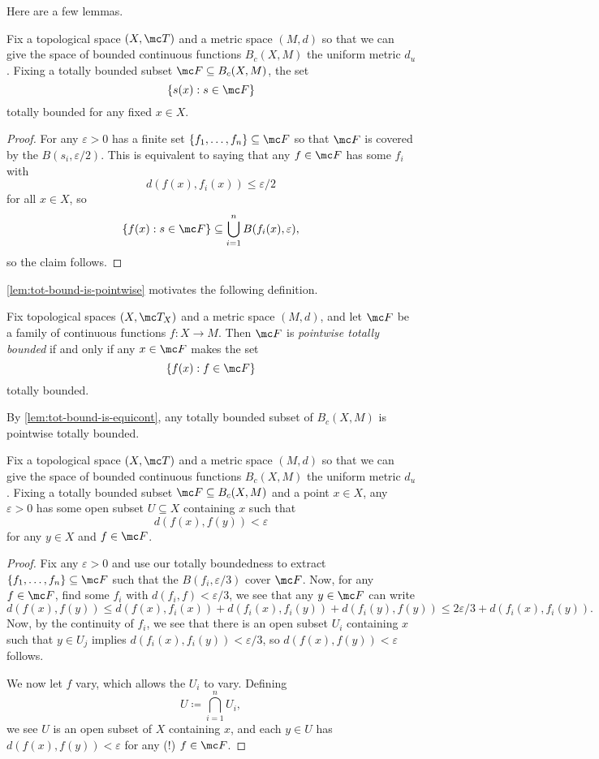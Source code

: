 \documentclass[../notes.tex]{subfiles}
\begin{document}
Here are a few lemmas.
\begin{lemma} \label{lem:tot-bound-is-pointwise}
	Fix a topological space $(X,\mc T)$ and a metric space $(M,d)$ so that we can give the space of bounded continuous functions $B_c(X,M)$ the uniform metric $d_u$. Fixing a totally bounded subset $\mc F\subseteq B_c(X,M)$, the set
	\[\{s(x):s\in \mc F\}\]
	totally bounded for any fixed $x\in X$.
\end{lemma}
\begin{proof}
	For any $\varepsilon>0$ has a finite set $\{f_1,\ldots,f_n\}\subseteq \mc F$ so that $\mc F$ is covered by the $B(s_i,\varepsilon/2)$. This is equivalent to saying that any $f\in \mc F$ has some $f_i$ with
	\[d(f(x),f_i(x))\le\varepsilon/2\]
	for all $x\in X$, so
	\[\{f(x):s\in \mc F\}\subseteq\bigcup_{i=1}^nB(f_i(x),\varepsilon),\]
	so the claim follows.
\end{proof}
\autoref{lem:tot-bound-is-pointwise} motivates the following definition.
\begin{definition}
	Fix topological spaces $(X,\mc T_X)$ and a metric space $(M,d)$, and let $\mc F$ be a family of continuous functions $f\colon X\to M$. Then $\mc F$ is \textit{pointwise totally bounded} if and only if any $x\in \mc F$ makes the set
	\[\{f(x):f\in\mc F\}\]
	totally bounded.
\end{definition}
\begin{example}
	By \autoref{lem:tot-bound-is-equicont}, any totally bounded subset of $B_c(X,M)$ is pointwise totally bounded.
\end{example}
\begin{lemma} \label{lem:tot-bound-is-equicont}
	Fix a topological space $(X,\mc T)$ and a metric space $(M,d)$ so that we can give the space of bounded continuous functions $B_c(X,M)$ the uniform metric $d_u$. Fixing a totally bounded subset $\mc F\subseteq B_c(X,M)$ and a point $x\in X$, any $\varepsilon>0$ has some open subset $U\subseteq X$ containing $x$ such that
	\[d(f(x),f(y))<\varepsilon\]
	for any $y\in X$ and $f\in \mc F$.
\end{lemma}
\begin{proof}
	Fix any $\varepsilon>0$ and use our totally boundedness to extract $\{f_1,\ldots,f_n\}\subseteq\mc F$ such that the $B(f_i,\varepsilon/3)$ cover $\mc F$. Now, for any $f\in \mc F$, find some $f_i$ with $d(f_i,f)<\varepsilon/3$, we see that any $y\in \mc F$ can write
	\[d(f(x),f(y))\le d(f(x),f_i(x))+d(f_i(x),f_i(y))+d(f_i(y),f(y))\le2\varepsilon/3+d(f_i(x),f_i(y)).\]
	Now, by the continuity of $f_i$, we see that there is an open subset $U_i$ containing $x$ such that $y\in U_j$ implies $d(f_i(x),f_i(y))<\varepsilon/3$, so $d(f(x),f(y))<\varepsilon$ follows.

	We now let $f$ vary, which allows the $U_i$ to vary. Defining
	\[U\coloneqq\bigcap_{i=1}^nU_i,\]
	we see $U$ is an open subset of $X$ containing $x$, and each $y\in U$ has $d(f(x),f(y))<\varepsilon$ for any (!) $f\in \mc F$.
\end{proof}
\end{document}
